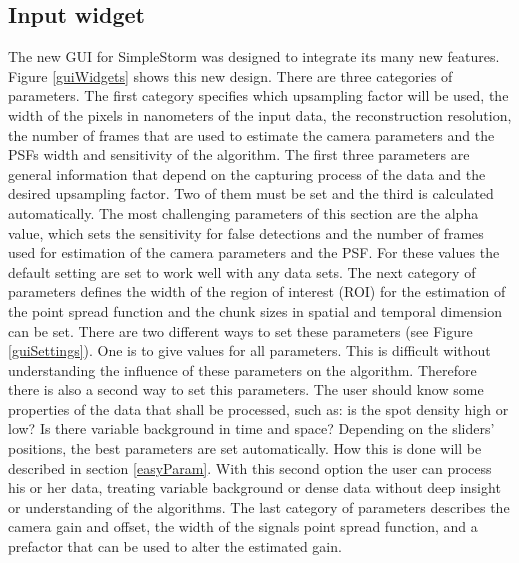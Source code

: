 \subsection{Input widget}
The new GUI for SimpleStorm was designed to integrate its many new features. Figure \ref{guiWidgets} shows this new design. \newline
There are three categories of parameters. The first category specifies which upsampling factor will be used, the width of the pixels in nanometers of the input data, the reconstruction resolution, the number of frames that are used to estimate the camera parameters and the PSFs width and sensitivity of the algorithm. The first three parameters are general information that depend on the capturing process of the data and the desired upsampling factor. Two of them must be set and the third is calculated automatically.\newline
The most challenging parameters of this section are the alpha value, which sets the sensitivity for false detections and the number of frames used for estimation of the camera parameters and the PSF. For these values the default setting are set to work well with any data sets. \newline
The next category of parameters defines the width of the region of interest (ROI) for the estimation of the point spread function and the chunk sizes in spatial and temporal dimension can be set. There are two different ways to set these parameters (see Figure \ref{guiSettings}). One is to give values for all parameters. This is difficult without understanding the influence of these parameters on the algorithm. Therefore there is also a second way to set this parameters. The user should know some properties of the data that shall be processed, such as: is the spot density high or low? Is there variable background in time and space? Depending on the sliders' positions, the best parameters are set automatically. How this is done will be described in section \ref{easyParam}. With this second option the user can process his or her data, treating variable background or dense data without deep insight or understanding of the algorithms.\newline
The last category of parameters describes the camera gain and offset, the width of the signals point spread function, and a prefactor that can be used to alter the estimated gain. 
